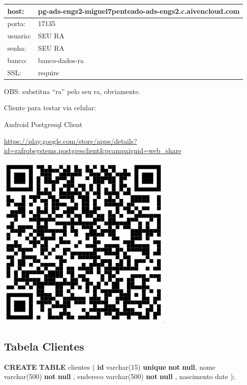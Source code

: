 \documentclass[
]{book}
\newenvironment{Shaded}{\begin{snugshade}}{\end{snugshade}}
\newcommand{\DataTypeTok}[1]{\textcolor[rgb]{0.13,0.29,0.53}{#1}}
\newcommand{\DecValTok}[1]{\textcolor[rgb]{0.00,0.00,0.81}{#1}}
\newcommand{\KeywordTok}[1]{\textcolor[rgb]{0.13,0.29,0.53}{\textbf{#1}}}
\newcommand{\NormalTok}[1]{#1}
\begin{document}
\begin{longtable}[]{@{}ll@{}}
\toprule\noalign{}
host: & pg-ads-engs2-miguel7penteado-ads-engs2.c.aivencloud.com \\
\midrule\noalign{}
\endhead
\bottomrule\noalign{}
\endlastfoot
porta: & 17135 \\
usuario: & SEU RA \\
senha: & SEU RA \\
banco: & banco-dados-ra \\
SSL: & require \\
\end{longtable}

OBS: substitua ``ra'' pelo seu ra, obviamente.

Cliente para testar via celular:

Android Postgresql Client

\url{https://play.google.com/store/apps/details?id=rafrobsystems.postgresclient&pcampaignid=web_share}

\includegraphics{images/clipboard-78059825.png}

\subsection{Tabela Clientes}\label{tabela-clientes}

\begin{Shaded}
\begin{Highlighting}[]
\KeywordTok{CREATE} \KeywordTok{TABLE}\NormalTok{ clientes}
\NormalTok{(}
\KeywordTok{id}         \DataTypeTok{varchar}\NormalTok{(}\DecValTok{15}\NormalTok{) }\KeywordTok{unique} \KeywordTok{not} \KeywordTok{null}\NormalTok{,}
\NormalTok{nome       }\DataTypeTok{varchar}\NormalTok{(}\DecValTok{500}\NormalTok{) }\KeywordTok{not} \KeywordTok{null}\NormalTok{ ,}
\NormalTok{endereco   }\DataTypeTok{varchar}\NormalTok{(}\DecValTok{500}\NormalTok{) }\KeywordTok{not} \KeywordTok{null}\NormalTok{ ,}
\NormalTok{nascimento }\DataTypeTok{date}
\NormalTok{);}
\end{Highlighting}
\end{Shaded}
\end{document}
